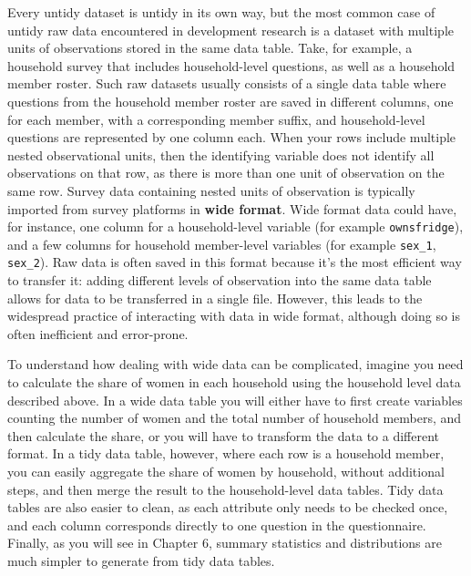 Every untidy dataset is untidy in its own way,
but the most common case of untidy raw data encountered in development research
is a dataset with multiple units of observations stored in the same data table.
Take, for example, a household survey that includes household-level questions,
as well as a household member roster.
Such raw datasets usually consists of a single data table
where questions from the household member roster are saved in different columns,
one for each member, with a corresponding member suffix,
and household-level questions are represented by one column each.
When your rows include multiple nested observational units,
then the identifying variable does not identify all observations on that row,
as there is more than one unit of observation on the same row.
Survey data containing nested units of observation is typically
imported from survey platforms in \textbf{wide format}.
Wide format data could have, for instance,
one column for a household-level variable (for example \texttt{ownsfridge}),
and a few columns for household member-level variables (for example \texttt{sex\_1}, \texttt{sex\_2}).
Raw data is often saved in this format because it's the most efficient way to transfer it:
adding different levels of observation into the same data table
allows for data to be transferred in a single file.
However, this leads to the widespread practice of interacting with data in wide format,
although doing so is often inefficient and error-prone.

To understand how dealing with wide data can be complicated,
imagine you need to calculate the share of women
in each household using the household level data described above.
In a wide data table you will either have to first create variables counting
the number of women and the total number of household members,
and then calculate the share,
or you will have to transform the data to a different format.
In a tidy data table, however, where each row is a household member,
you can easily aggregate the share of women by household,
without additional steps,
and then merge the result to the household-level data tables.
Tidy data tables are also easier to clean,
as each attribute only needs to be checked once,
and each column corresponds directly to one question in the questionnaire.
Finally, as you will see in Chapter 6,
summary statistics and distributions are much simpler
to generate from tidy data tables.

